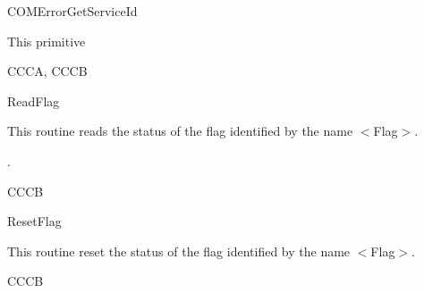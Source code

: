 \begin{function}{COMErrorGetServiceId}
  \begin{fundescription}
    This primitive 
  \end{fundescription}
  \begin{funparameters}
  \end{funparameters}
  \begin{funreturn}
    \fret{}
  \end{funreturn}
  \begin{funconformance}
    CCCA, CCCB
  \end{funconformance}
\end{function}

\begin{function}{ReadFlag}
	\begin{fundescription}
	This routine reads the status of the flag identified by the name $<$Flag$>$.
   	\end{fundescription}
  	\begin{funreturn}
   	.
   	\end{funreturn}
	\begin{funconformance}
     	 CCCB
     	\end{funconformance}
\end{function}

\begin{function}{ResetFlag}
	\begin{fundescription}
	This routine reset the status of the flag identified by the name $<$Flag$>$.
   	\end{fundescription}

	\begin{funconformance}
     	CCCB
     	\end{funconformance}
\end{function}


